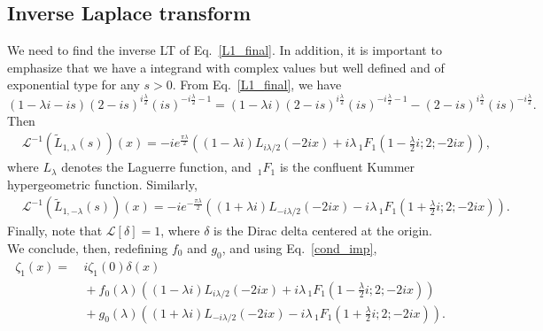 \documentclass[
 aip,
 jmp,
 amsmath,amssymb,
 reprint,
 nofootinbib,
]{revtex4-2}
\begin{document}
\subsection{Inverse Laplace transform}

We need to find the inverse LT of Eq.~\eqref{L1_final}. In addition, it is important to emphasize that we have a integrand with complex values but well defined and of exponential type for any $s > 0$.
From Eq.~\eqref{L1_final}, we have
\begin{equation}\label{eq:L1_final-2}
    (1-\lambda i-i s) (2-i s)^{i\frac{\lambda}{2} } (i s)^{-i\frac{\lambda}{2}-1} = (1-\lambda i) (2-i s)^{i\frac{\lambda}{2} } (i s)^{-i\frac{\lambda}{2}-1} -  (2-i s)^{i\frac{\lambda}{2} } (i s)^{-i\frac{\lambda}{2}}.
\end{equation}
Then
\begin{equation}\label{importante}
\begin{aligned}
& \mathcal L^{-1}\left(\widetilde L_{1,\lambda} (s) \right)(x) =  -i e^{\frac{\pi  \lambda}{2}}  \left( (1-\lambda i)  L_{i \lambda/2}(-2 i x)  + i\lambda \, _1F_1\left(1- \frac{\lambda}2 i ;2;-2 i x \right) \right),
\end{aligned}
\end{equation}
where $L_\lambda$ denotes the Laguerre function, and $\,_1F_1$ is the confluent Kummer hypergeometric function. Similarly, 
\begin{equation}
\begin{aligned}
& \mathcal L^{-1}\left(\widetilde L_{1,-\lambda} (s) \right)(x) = -i  e^{-\frac{\pi  \lambda}{2}}   \left( (1+ \lambda i)L_{-i \lambda/2}(-2 i x) - i\lambda \, _1F_1\left(1+  \frac{\lambda}2i ;2;-2 i x \right) \right).
\end{aligned}
\end{equation}
Finally, note that $\mathcal L[\delta] =1$, where $\delta$ is the Dirac delta centered at the origin. We conclude, then, redefining $f_0$ and $g_0$, and using Eq.~\eqref{cond_imp},
\begin{equation}
\begin{aligned}
\zeta_1(x)= &~{}i \zeta_1(0)\delta(x) \\
&~{} + f_0(\lambda) \left(  (1-\lambda i)  L_{i \lambda/2}(-2 i x)  + i\lambda \, _1F_1\left(1- \frac{\lambda}2 i ;2;-2 i x \right) \right)\\
&~{} + g_0(\lambda) \left( (1+ \lambda i)L_{-i \lambda/2}(-2 i x) - i\lambda \, _1F_1\left(1+  \frac{\lambda}2i ;2;-2 i x \right)\right).
\end{aligned}
\end{equation}
\end{document}
